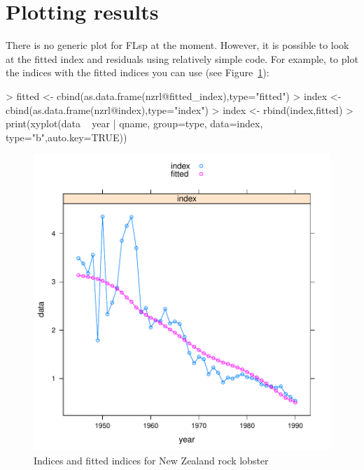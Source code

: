 \documentclass[a4paper]{article}
\begin{document}
\section{Plotting results}
There is no generic plot for FLsp at the moment. However, it is possible to look at the fitted index and residuals using relatively simple code. For example, to plot the indices with the fitted indices you can use (see Figure~\ref{fig:fitted_index_nzrl}):

\begin{center}
\begin{minipage}[H]{0.95\textwidth}%
\begin{shaded}%
\begin{Schunk}
\begin{Sinput}
> fitted <- cbind(as.data.frame(nzrl@fitted_index),type="fitted")
> index <- cbind(as.data.frame(nzrl@index),type="index")
> index <- rbind(index,fitted)
> print(xyplot(data ~ year | qname, group=type, data=index, type="b",auto.key=TRUE))
\end{Sinput}
\end{Schunk}
\end{shaded}%
\end{minipage}
\end{center}

\begin{figure}
\begin{center}
\includegraphics{flsp_man-nzrlfittedindexplot}
\end{center}
\caption{Indices and fitted indices for New Zealand rock lobster}
\label{fig:fitted_index_nzrl}
\end{figure}
\end{document}
